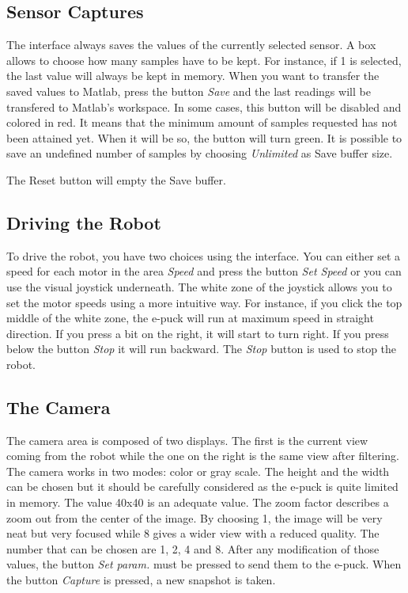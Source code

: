\documentclass[11pt,oneside,english,a4paper]{article}
\begin{document}
\subsection{Sensor Captures}
The interface always saves the values of the currently selected sensor. A box allows to choose how many samples have to be kept. For instance, if 1 is selected, the last value will always be kept in memory. When you want to transfer the saved values to Matlab, press the button \emph{Save} and the last readings will be transfered to Matlab's workspace. In some cases, this button will be disabled and colored in red. It means that the minimum amount of samples requested has not been attained yet. When it will be so, the button will turn green. It is possible to save an undefined number of samples by choosing \emph{Unlimited} as Save buffer size.
\par The Reset button will empty the Save buffer. 

\subsection{Driving the Robot}
To drive the robot, you have two choices using the interface. You can either set a speed for each motor in the area \emph{Speed} and press the button \emph{Set Speed} or you can use the visual joystick underneath. The white zone of the joystick allows you to set the motor speeds using a more intuitive way. For instance, if you click the top middle of the white zone, the e-puck will run at maximum speed in straight direction. If you press a bit on the right, it will start to turn right. If you press below the button \emph{Stop} it will run backward. The \emph{Stop} button is used to stop the robot. 

\subsection{The Camera}
The camera area is composed of two displays. The first is the current view coming from the robot while the one on the right is the same view after filtering. The camera works in two modes: color or gray scale. The height and the width can be chosen but it should be carefully considered as the e-puck is quite limited in memory. The value 40x40 is an adequate value. The zoom factor describes a zoom out from the center of the image. By choosing 1, the image will be very neat but very focused while 8 gives a wider view with a reduced quality. The number that can be chosen are 1, 2, 4 and 8. After any modification of those values, the button \emph{Set param.} must be pressed to send them to the e-puck. When the button \emph{Capture} is pressed, a new snapshot is taken.
\end{document}

